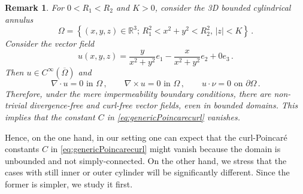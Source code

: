\documentclass[a4paper,11pt]{amsart}
\newtheorem{remark}{Remark}[section]
\numberwithin{equation}{section}
\numberwithin{figure}{section}
\newcommand{\R}{\mathbb{R}}
\begin{document}
\begin{remark}\label{contro}
	For $0<R_1<R_2$ and $K>0$, consider the 3D bounded cylindrical annulus
	$$
	\Omega=\left\{(x,y,z)\in\R^3;\, R_1^2<x^2+y^2<R_2^2,\, |z|<K\right\}\, .
	$$
	Consider the vector field
	$$
	u(x,y,z)=\frac{y}{x^2+y^2}e_1-\frac{x}{x^2+y^2}e_2+0e_3\, .
	$$
	Then $u\in C^\infty(\overline{\Omega})$ and
	$$
	\nabla\cdot u=0\mbox{ in }\Omega\, ,\qquad\nabla\times u=0\mbox{ in }\Omega\, ,\qquad u\cdot\nu=0\mbox{ on }\partial\Omega\, .
	$$
Therefore, under the mere impermeability boundary conditions, there are non-trivial divergence-free and curl-free vector fields, even in bounded domains. This implies that the constant $C$ in \eqref{eq:genericPoincarecurl} vanishes.
\end{remark}


Hence, on the one hand, in our setting one can expect that the curl-Poincaré constants $C$ in \eqref{eq:genericPoincarecurl} might vanish because the domain is unbounded and not simply-connected. On the other hand, we stress that the cases with still inner or outer cylinder will be significantly different. Since the former is simpler, we study it first.

\smallskip
\end{document}
